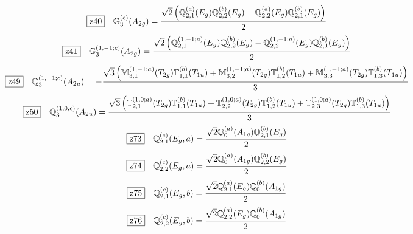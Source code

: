 \documentclass[fleqn,10pt,landscape]{jsarticle}
\begin{document}
\begin{dmath*}
\hspace*{3mm}\fbox{z40}\quad \mathbb{G}_{3}^{(c)}(A_{2g})=\frac{\sqrt{2} \left(\mathbb{Q}_{2,1}^{(a)}(E_{g}) \mathbb{Q}_{2,2}^{(b)}(E_{g}) - \mathbb{Q}_{2,2}^{(a)}(E_{g}) \mathbb{Q}_{2,1}^{(b)}(E_{g})\right)}{2}
\end{dmath*}
\begin{dmath*}
\hspace*{3mm}\fbox{z41}\quad \mathbb{G}_{3}^{(1,-1;c)}(A_{2g})=\frac{\sqrt{2} \left(\mathbb{Q}_{2,1}^{(1,-1;a)}(E_{g}) \mathbb{Q}_{2,2}^{(b)}(E_{g}) - \mathbb{Q}_{2,2}^{(1,-1;a)}(E_{g}) \mathbb{Q}_{2,1}^{(b)}(E_{g})\right)}{2}
\end{dmath*}
\begin{dmath*}
\hspace*{3mm}\fbox{z49}\quad \mathbb{Q}_{3}^{(1,-1;c)}(A_{2u})=- \frac{\sqrt{3} \left(\mathbb{M}_{3,1}^{(1,-1;a)}(T_{2g}) \mathbb{T}_{1,1}^{(b)}(T_{1u}) + \mathbb{M}_{3,2}^{(1,-1;a)}(T_{2g}) \mathbb{T}_{1,2}^{(b)}(T_{1u}) + \mathbb{M}_{3,3}^{(1,-1;a)}(T_{2g}) \mathbb{T}_{1,3}^{(b)}(T_{1u})\right)}{3}
\end{dmath*}
\begin{dmath*}
\hspace*{3mm}\fbox{z50}\quad \mathbb{Q}_{3}^{(1,0;c)}(A_{2u})=\frac{\sqrt{3} \left(\mathbb{T}_{2,1}^{(1,0;a)}(T_{2g}) \mathbb{T}_{1,1}^{(b)}(T_{1u}) + \mathbb{T}_{2,2}^{(1,0;a)}(T_{2g}) \mathbb{T}_{1,2}^{(b)}(T_{1u}) + \mathbb{T}_{2,3}^{(1,0;a)}(T_{2g}) \mathbb{T}_{1,3}^{(b)}(T_{1u})\right)}{3}
\end{dmath*}
\begin{dmath*}
\hspace*{3mm}\fbox{z73}\quad \mathbb{Q}_{2,1}^{(c)}(E_{g},a)=\frac{\sqrt{2} \mathbb{Q}_{0}^{(a)}(A_{1g}) \mathbb{Q}_{2,1}^{(b)}(E_{g})}{2}
\end{dmath*}
\begin{dmath*}
\hspace*{3mm}\fbox{z74}\quad \mathbb{Q}_{2,2}^{(c)}(E_{g},a)=\frac{\sqrt{2} \mathbb{Q}_{0}^{(a)}(A_{1g}) \mathbb{Q}_{2,2}^{(b)}(E_{g})}{2}
\end{dmath*}
\begin{dmath*}
\hspace*{3mm}\fbox{z75}\quad \mathbb{Q}_{2,1}^{(c)}(E_{g},b)=\frac{\sqrt{2} \mathbb{Q}_{2,1}^{(a)}(E_{g}) \mathbb{Q}_{0}^{(b)}(A_{1g})}{2}
\end{dmath*}
\begin{dmath*}
\hspace*{3mm}\fbox{z76}\quad \mathbb{Q}_{2,2}^{(c)}(E_{g},b)=\frac{\sqrt{2} \mathbb{Q}_{2,2}^{(a)}(E_{g}) \mathbb{Q}_{0}^{(b)}(A_{1g})}{2}
\end{dmath*}
\end{document}

